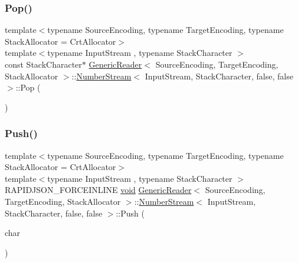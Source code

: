 \subsubsection{\texorpdfstring{Pop()}{Pop()}}
{\footnotesize\ttfamily template$<$typename Source\+Encoding, typename Target\+Encoding, typename Stack\+Allocator = Crt\+Allocator$>$ \\
template$<$typename Input\+Stream , typename Stack\+Character $>$ \\
const Stack\+Character$\ast$ \hyperlink{classGenericReader}{Generic\+Reader}$<$ Source\+Encoding, Target\+Encoding, Stack\+Allocator $>$\+::\hyperlink{classGenericReader_1_1NumberStream}{Number\+Stream}$<$ Input\+Stream, Stack\+Character, false, false $>$\+::Pop (\begin{DoxyParamCaption}{ }\end{DoxyParamCaption})\hspace{0.3cm}{\ttfamily [inline]}}

\mbox{\label{classGenericReader_1_1NumberStream_3_01InputStream_00_01StackCharacter_00_01false_00_01false_01_4_a15561810a953f190fe517d07fdd3ed88}} 
\subsubsection{\texorpdfstring{Push()}{Push()}}
{\footnotesize\ttfamily template$<$typename Source\+Encoding, typename Target\+Encoding, typename Stack\+Allocator = Crt\+Allocator$>$ \\
template$<$typename Input\+Stream , typename Stack\+Character $>$ \\
R\+A\+P\+I\+D\+J\+S\+O\+N\+\_\+\+F\+O\+R\+C\+E\+I\+N\+L\+I\+NE \hyperlink{imgui__impl__opengl3__loader_8h_ac668e7cffd9e2e9cfee428b9b2f34fa7}{void} \hyperlink{classGenericReader}{Generic\+Reader}$<$ Source\+Encoding, Target\+Encoding, Stack\+Allocator $>$\+::\hyperlink{classGenericReader_1_1NumberStream}{Number\+Stream}$<$ Input\+Stream, Stack\+Character, false, false $>$\+::Push (\begin{DoxyParamCaption}\item[{char}]{ }\end{DoxyParamCaption})\hspace{0.3cm}{\ttfamily [inline]}}

